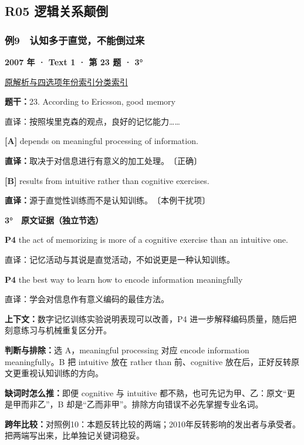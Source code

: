 \documentclass[11pt,a4paper]{article}
\begin{document}
\subsection{R05 逻辑关系颠倒}
\subsubsection{例9　认知多于直觉，不能倒过来}\label{case-2007-T1-Q23}
\noindent\textbf{2007 年 · Text 1 · 第 23 题 · 3°}\par\noindent \href{https://zj139.github.io/math-notes/english/a69829b7fe6a2f532d31c053/\#q23}{原解析与四选项}\quad \hyperref[idx-2007-T1-Q23]{年份索引}\quad \hyperref[class-R05]{分类索引}\par\smallskip
\noindent\textbf{题干：}23. According to Ericsson, good memory\par
直译：按照埃里克森的观点，良好的记忆能力……\par
{}\noindent\textbf{[A]} depends on meaningful processing of information.\par\nopagebreak
\noindent\textbf{直译：}取决于对信息进行有意义的加工处理。　〔正确〕\par
{}\noindent\textbf{[B]} results from intuitive rather than cognitive exercises.\par\nopagebreak
\noindent\textbf{直译：}源于直觉性训练而不是认知训练。　〔本例干扰项〕\par
\begin{evidence}\textbf{3°　原文证据（独立节选）}\par
\textbf{P4} the act of memorizing is more of a cognitive exercise than an intuitive one.\par 直译：记忆活动与其说是直觉活动，不如说更是一种认知训练。\par
\textbf{P4} the best way to learn how to encode information meaningfully\par 直译：学会对信息作有意义编码的最佳方法。\par
\end{evidence}
\noindent\textbf{上下文：}数字记忆训练实验说明表现可以改善，P4 进一步解释编码质量，随后把刻意练习与机械重复区分开。\par
\noindent\textbf{判断与排除：}选 A，meaningful processing 对应 encode information meaningfully。B 把 intuitive 放在 rather than 前、cognitive 放在后，正好反转原文更重视认知训练的方向。\par
\noindent\textbf{缺词时怎么推：}即便 cognitive 与 intuitive 都不熟，也可先记为甲、乙：原文“更是甲而非乙”，B 却是“乙而非甲”。排除方向错误不必先掌握专业名词。\par
\noindent\textbf{跨年比较：}对照例10：本题反转比较的两端；2010年反转影响的发出者与承受者。把两端写出来，比单独记关键词稳妥。\par
\clearpage
\end{document}
